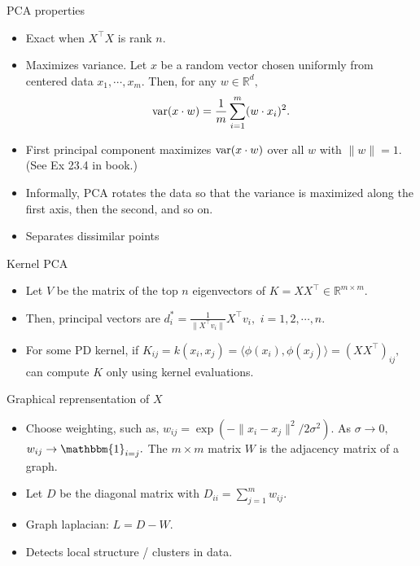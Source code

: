 \documentclass[final]{beamer}
\begin{document}
\begin{frame}{PCA properties}
	\begin{itemize}
		\item Exact when $X^\top X$ is rank $n.$
		\pause
	\item Maximizes variance. Let $x$ be a random vector chosen uniformly from centered data $x_1,\cdots,x_m.$ Then, for any $w \in \mathbb{R}^d,$ 
		$${\rm var}(x\cdot w) = \dfrac{1}{m}\sum_{i=1}^m (w\cdot x_i)^2.$$
	\pause
\item First principal component maximizes ${\rm var}(x\cdot w)$ over all $w$ with $\|w\| = 1.$ (See Ex 23.4 in book.)
	\pause
	\item Informally, PCA rotates the data so that the variance is maximized along the first axis, then the second, and so on.
	\pause
	\item Separates dissimilar points
			
	\end{itemize}
\end{frame}
\begin{frame}{Kernel PCA}
	\begin{itemize}
		\item Let $V$ be the matrix of the top $n$ eigenvectors of $K = X X^\top \in \mathbb{R}^{m\times m}.$ 
		\pause
		\item Then, principal vectors are $d^*_i = \frac{1}{\|X^\top v_i\|} X^\top v_i,$ $i = 1,2,\cdots,n.$
		\pause
		\item For some PD kernel, if $K_{ij} = k(x_i,x_j) = \langle \phi(x_i), \phi(x_j)\rangle = (X X^\top)_{ij},$ can compute $K$ only using kernel evaluations.
		
	\end{itemize}
\end{frame}
\begin{frame}{Graphical reprensentation of $X$}
	\begin{itemize}
		\item Choose weighting, such as, $w_{ij} = \exp(-\|x_i - x_j\|^2/2\sigma^2).$ As $\sigma \to 0,$ $w_{ij} \to \mathbbm{1}_{i=j}.$ The $m \times m$ matrix $W$ is the adjacency matrix of a graph.
		\pause
		\item Let $D$ be the diagonal matrix with $D_{ii} = \sum_{j=1}^m w_{ij}.$
		\pause 
		\item Graph laplacian: $L = D - W.$
		\pause 
		\item Detects local structure / clusters in data.

	\end{itemize}

\end{frame}
\end{document}
